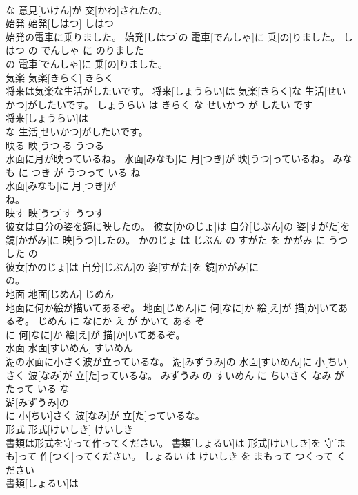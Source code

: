 \documentclass[8pt]{extreport}
\begin{document}
\begin{CJK}{UTF8}{min}
\\	な 意見[いけん]が 交[かわ]されたの。			
\\	始発	始発[しはつ]	しはつ	
\\	始発の電車に乗りました。	始発[しはつ]の 電車[でんしゃ]に 乗[の]りました。	しはつ の でんしゃ に のりました	
\\	の 電車[でんしゃ]に 乗[の]りました。			
\\	気楽	気楽[きらく]	きらく	
\\	将来は気楽な生活がしたいです。	将来[しょうらい]は 気楽[きらく]な 生活[せいかつ]がしたいです。	しょうらい は きらく な せいかつ が したい です	
\\	将来[しょうらい]は
\\	な 生活[せいかつ]がしたいです。			
\\	映る	映[うつ]る	うつる	
\\	水面に月が映っているね。	水面[みなも]に 月[つき]が 映[うつ]っているね。	みなも に つき が うつって いる ね	
\\	水面[みなも]に 月[つき]が
\\	ね。			
\\	映す	映[うつ]す	うつす	
\\	彼女は自分の姿を鏡に映したの。	彼女[かのじょ]は 自分[じぶん]の 姿[すがた]を 鏡[かがみ]に 映[うつ]したの。	かのじょ は じぶん の すがた を かがみ に うつした の	
\\	彼女[かのじょ]は 自分[じぶん]の 姿[すがた]を 鏡[かがみ]に
\\	の。			
\\	地面	地面[じめん]	じめん	
\\	地面に何か絵が描いてあるぞ。	地面[じめん]に 何[なに]か 絵[え]が 描[か]いてあるぞ。	じめん に なにか え が かいて ある ぞ	
\\	に 何[なに]か 絵[え]が 描[か]いてあるぞ。			
\\	水面	水面[すいめん]	すいめん	
\\	湖の水面に小さく波が立っているな。	湖[みずうみ]の 水面[すいめん]に 小[ちい]さく 波[なみ]が 立[た]っているな。	みずうみ の すいめん に ちいさく なみ が たって いる な	
\\	湖[みずうみ]の
\\	に 小[ちい]さく 波[なみ]が 立[た]っているな。			
\\	形式	形式[けいしき]	けいしき	
\\	書類は形式を守って作ってください。	書類[しょるい]は 形式[けいしき]を 守[まも]って 作[つく]ってください。	しょるい は けいしき を まもって つくって ください	
\\	書類[しょるい]は

\end{CJK}
\end{document}
